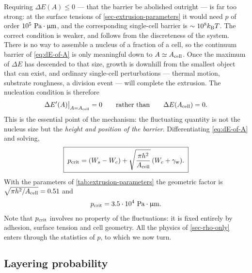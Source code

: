 \documentclass[a5paper]{article}
\begin{document}
Requiring $\Delta E(A) \le 0$ --- that the barrier be abolished outright --- is far too strong: at the surface tensions of \cref{sec-extrusion-parameters} it would need $p$ of order $10^{5}~\text{Pa}\cdot\upmu\mathrm{m}$, and the corresponding single-cell barrier is $\sim10^{8}k_\mathrm{B} T$. The correct condition is weaker, and follows from the discreteness of the system. There is no way to assemble a nucleus of a fraction of a cell, so the continuum barrier of \eqref{eq:dE-of-A} is only meaningful down to $A\simeq A_{\text{cell}}$. Once the maximum of $\Delta E$ has descended to that size, growth is downhill from the smallest object that can exist, and ordinary single-cell perturbations --- thermal motion, substrate roughness, a division event --- will complete the extrusion. The nucleation condition is therefore
\begin{align}
    \label{eq:nucleation-condition}
    \Delta E'(A)\big|_{A = A_{\text{cell}}} = 0
    \qquad\text{rather than}\qquad
    \Delta E(A_{\text{cell}}) = 0 .
\end{align}
This is the essential point of the mechanism: the fluctuating quantity is not the nucleus size but the \emph{height and position of the barrier}. Differentiating \eqref{eq:dE-of-A} and solving,
\begin{align}
    \label{eq:pcrit}
    \boxed{\;
    p_{\text{crit}} = (W_s-W_c) + \sqrt{\frac{\pi h^2}{A_{\text{cell}}}}\,(W_c+\gamma_{\rm w}) .
    \;}
\end{align}
With the parameters of \cref{tab:extrusion-parameters} the geometric factor is $\sqrt{\pi h^2/A_{\text{cell}}} = 0.51$ and
\begin{align}
    \label{eq:pcrit-value}
    p_{\text{crit}} = 3.5\cdot10^{4}~\text{Pa}\cdot\upmu\mathrm{m} .
\end{align}
Note that $p_{\text{crit}}$ involves no property of the fluctuations: it is fixed entirely by adhesion, surface tension and cell geometry. All the physics of \cref{sec-rho-only} enters through the statistics of $p$, to which we now turn.

\subsection{Layering probability}
\label{sec-layering-probability}
\end{document}
